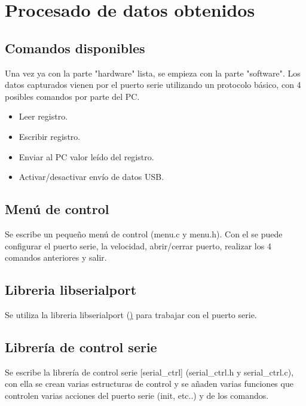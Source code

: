 \section{Procesado de datos obtenidos}

\subsection{Comandos disponibles}
Una vez ya con la parte "hardware" lista, se empieza con la parte "software". Los datos capturados vienen por el puerto serie utilizando un protocolo básico, con 4 posibles comandos por parte del PC.
\begin{itemize}
    \item Leer registro.
    \item Escribir registro.
    \item Enviar al PC valor leído del registro.
    \item Activar/desactivar envío de datos USB.
\end{itemize}

\subsection{Menú de control}
Se escribe un pequeño menú de control (menu.c y menu.h). Con el se puede configurar el puerto serie, la velocidad, abrir/cerrar puerto, realizar los 4 comandos anteriores y salir.

\subsection{Libreria libserialport}
Se utiliza la libreria libserialport (\href{https://sigrok.org/wiki/Libserialport}) para trabajar con el puerto serie.

\subsection{Librería de control serie}
Se escribe la librería de control serie [serial\_ctrl] (serial\_ctrl.h y serial\_ctrl.c), con ella se crean varias estructuras de control y se añaden varias funciones que controlen varias acciones del puerto serie (init, etc..) y de los comandos.

